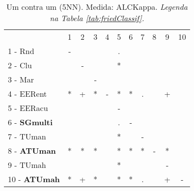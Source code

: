 \begin{table}[h]
\caption{Um contra um (5NN). Medida: ALCKappa. \textit{Legenda na Tabela \ref{tab:friedClassif}.}}
\begin{center}\begin{tabular}{lcc|cc|cc|cc|cc}
 			& 1 & 2 & 3 & 4 & 5 & 6 & 7 & 8 & 9 & 10\\
1 - Rnd  	& - &   &   &   & . &   &   &   &   &   \\
2 - Clu  	&   & - &   &   & * &   &   &   &   &   \\ \hline
3 - Mar  	&   &   & - &   &   &   &   &   &   &   \\
4 - EERent	& * & + & * & - & * & * & . &   & + &   \\ \hline
5 - EERacu	&   &   &   &   & - &   &   &   &   &   \\
6 - \textbf{SGmulti}	&   &   &   &   & . & - &   &   &   &   \\ \hline
7 - TUman	&   &   &   &   & * &   & - &   &   &   \\
8 - \textbf{ATUman}	& * & * & * &   & * & * & * & - & * &   \\ \hline
9 - TUmah	&   &   &   &   & * &   &   &   & - &   \\
10 - \textbf{ATUmah}	& * & + & * &   & * & * & . &   & + & - \\ \hline\end{tabular}
\label{stratsALCKappaFried5NNRedux}
\end{center}
\end{table}